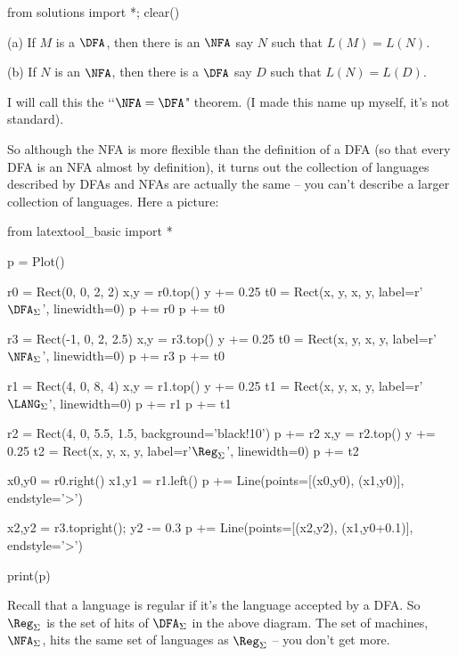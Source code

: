 \begin{python0}
  from solutions import *; clear()
\end{python0}

\begin{thm} \mbox{}
 \begin{tightlist}
 \item[(a)] If $M$ is a $\DFA$, then there is an $\NFA$ say $N$ such
  that $L(M) = L(N)$.
 \item[(b)] If $N$ is an $\NFA$, then there is a $\DFA$ say $D$ such
 that $L(N) = L(D)$.
 \end{tightlist}
\end{thm}

I will call this the \lq\lq $\NFA = \DFA$" theorem. (I made this name up
myself, it's not standard).

So although the NFA is more flexible than the definition of a DFA
(so that every DFA is an NFA almost by definition),
it turns out the collection of languages described by DFAs and NFAs
are actually the same -- you can't describe a larger collection of languages.
Here a picture:

\begin{python}
from latextool_basic import *

p = Plot()

r0 = Rect(0, 0, 2, 2)
x,y = r0.top()
y += 0.25
t0 = Rect(x, y, x, y, label=r'$\DFA_\Sigma$', linewidth=0)
p += r0
p += t0

r3 = Rect(-1, 0, 2, 2.5)
x,y = r3.top()
y += 0.25
t0 = Rect(x, y, x, y, label=r'$\NFA_\Sigma$', linewidth=0)
p += r3
p += t0

r1 = Rect(4, 0, 8, 4)
x,y = r1.top()
y += 0.25
t1 = Rect(x, y, x, y, label=r'$\LANG_\Sigma$', linewidth=0)
p += r1
p += t1

r2 = Rect(4, 0, 5.5, 1.5, background='black!10')
p += r2
x,y = r2.top()
y += 0.25
t2 = Rect(x, y, x, y, label=r'$\Reg_\Sigma$', linewidth=0)
p += t2

x0,y0 = r0.right()
x1,y1 = r1.left()
p += Line(points=[(x0,y0), (x1,y0)], endstyle='>')

x2,y2 = r3.topright(); y2 -= 0.3
p += Line(points=[(x2,y2), (x1,y0+0.1)], endstyle='>')

print(p)
\end{python}

Recall that a language is regular if it's the language
accepted by a DFA.
So $\Reg_\Sigma$ is the set of hits of $\DFA_\Sigma$ in the above diagram.
The set of machines, $\NFA_\Sigma$, hits
the same set of languages as $\Reg_\Sigma$ -- you don't get more.

